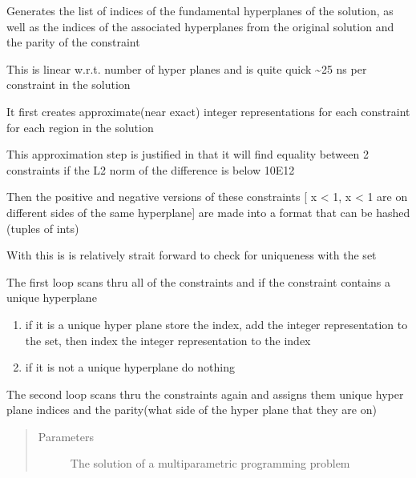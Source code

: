 \documentclass[letterpaper,10pt,english]{sphinxmanual}
\begin{document}
\begin{fulllineitems}
\label{\detokenize{ppopt.upop:ppopt.upop.upop_utils.find_unique_hyperplanes}}
\sphinxAtStartPar
Generates the list of indices of the fundamental hyperplanes of the solution, as well as the indices of the associated hyperplanes from the original solution and the parity of the constraint

\sphinxAtStartPar
This is linear w.r.t. number of hyper planes and is quite quick \textasciitilde{}25 ns per constraint in the solution

\sphinxAtStartPar
It first creates approximate(near exact) integer representations for each constraint for each region in the solution

\sphinxAtStartPar
This approximation step is justified in that it will find equality between 2 constraints if the L2 norm of the difference is below 10E\sphinxhyphen{}12

\sphinxAtStartPar
Then the positive and negative versions of these constraints {[} \sphinxhyphen{}x \textless{} \sphinxhyphen{}1, x \textless{} 1 are on different sides of the same hyperplane{]} are made into a format that can be hashed (tuples of ints)

\sphinxAtStartPar
With this is is relatively strait forward to check for uniqueness with the set

\sphinxAtStartPar
The first loop scans thru all of the constraints and if the constraint contains a unique hyperplane
\begin{enumerate}
%
\item {} 
\sphinxAtStartPar
if it is a unique hyper plane store the index, add the integer representation to the set, then index the integer representation to the index

\item {} 
\sphinxAtStartPar
if it is not a unique hyperplane do nothing

\end{enumerate}

\sphinxAtStartPar
The second loop scans thru the constraints again and assigns them unique hyper plane indices and the parity(what side of the hyper plane that they are on)
\begin{quote}\begin{description}
\item[{Parameters}] \leavevmode
\sphinxAtStartPar
{} \textendash{} The solution of a multiparametric programming problem


\end{description}
\end{quote}
\end{fulllineitems}
\end{document}
